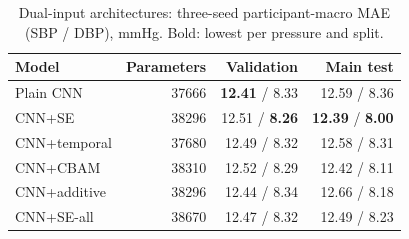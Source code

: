 \begin{table}[t]
\centering\caption{Dual-input architectures: three-seed participant-macro MAE (SBP / DBP), mmHg. Bold: lowest per pressure and split.}\label{tab:architecture}
\scriptsize
\setlength{\tabcolsep}{4pt}
\begin{tabular}{lrrr}\toprule
Model & Parameters & Validation & Main test\\\midrule
Plain CNN & 37666 & \textbf{12.41} / 8.33 & 12.59 / 8.36\\
CNN+SE & 38296 & 12.51 / \textbf{8.26} & \textbf{12.39} / \textbf{8.00}\\
CNN+temporal & 37680 & 12.49 / 8.32 & 12.58 / 8.31\\
CNN+CBAM & 38310 & 12.52 / 8.29 & 12.42 / 8.11\\
CNN+additive & 38296 & 12.44 / 8.34 & 12.66 / 8.18\\
CNN+SE-all & 38670 & 12.47 / 8.32 & 12.49 / 8.23\\
\bottomrule\end{tabular}
\end{table}
